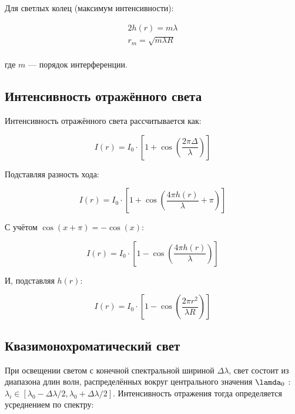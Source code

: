 \documentclass[a4paper,11pt]{article}
\theoremstyle{definition}
\begin{document}
    Для светлых колец (максимум интенсивности):

    \begin{gather}
        2h(r) = m \lambda\\
        r_m = \sqrt{m \lambda R}\\
    \end{gather}

    где \( m \) — порядок интерференции.

    \subsection{Интенсивность отражённого света}
    Интенсивность отражённого света рассчитывается как:

    \begin{equation}
        I(r) = I_0 \cdot \left[1 + \cos\left(\frac{2\pi \Delta}{\lambda} \right)\right]\label{eq:equation3}
    \end{equation}

    Подставляя разность хода:

    \begin{equation}
        I(r) = I_0 \cdot \left[1 + \cos\left(\frac{4\pi h(r)}{\lambda} + \pi \right)\right]\label{eq:equation4}
    \end{equation}

    С учётом \( \cos(x + \pi) = -\cos(x) \):

    \begin{equation}
        I(r) = I_0 \cdot \left[1 - \cos\left(\frac{4\pi h(r)}{\lambda} \right)\right]\label{eq:equation5}
    \end{equation}

    И, подставляя \( h(r) \):

    \begin{equation}
        I(r) = I_0 \cdot \left[1 - \cos\left(\frac{2\pi r^2}{\lambda R} \right)\right]\label{eq:equation6}
    \end{equation}

    \subsection{Квазимонохроматический свет}
    При освещении светом с конечной спектральной шириной \( \Delta\lambda \), свет состоит из диапазона
    длин волн, распределённых вокруг центрального значения \(\lamda_0\) : \( \lambda_i \in [\lambda_0 - \Delta\lambda/2, \lambda_0 + \Delta\lambda/2] \).
    Интенсивность отражения тогда определяется усреднением по спектру:
\end{document}
